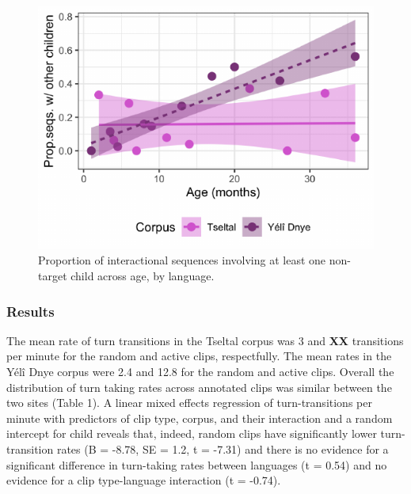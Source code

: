 \documentclass[10pt, letterpaper]{article}
\newenvironment{CodeChunk}{}{}
\begin{document}
\begin{CodeChunk}
\begin{figure}[h]

{\centering \includegraphics{figs/tseyel.is.fig-1} 

}

\caption[Proportion of interactional sequences involving at least one non-target child across age, by language]{Proportion of interactional sequences involving at least one non-target child across age, by language.}\label{fig:tseyel.is.fig}
\end{figure}
\end{CodeChunk}

\hypertarget{results}{%
\subsubsection{Results}\label{results}}

The mean rate of turn transitions in the Tseltal corpus was 3 and
\textbf{XX} transitions per minute for the random and active clips,
respectfully. The mean rates in the Yélî Dnye corpus were 2.4 and 12.8
for the random and active clips. Overall the distribution of turn taking
rates across annotated clips was similar between the two sites (Table
1). A linear mixed effects regression of turn-transitions per minute
with predictors of clip type, corpus, and their interaction and a random
intercept for child reveals that, indeed, random clips have
significantly lower turn-transition rates (B = -8.78, SE = 1.2, t =
-7.31) and there is no evidence for a significant difference in
turn-taking rates between languages (t = 0.54) and no evidence for a
clip type-language interaction (t = -0.74).
\end{document}

